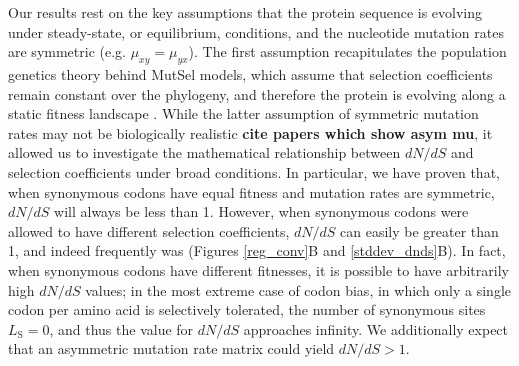 \documentclass[11pt]{article}
\begin{document}
Our results rest on the key assumptions that the protein sequence is evolving under steady-state, or equilibrium, conditions, and the nucleotide mutation rates are symmetric (e.g. $\mu_{xy} = \mu_{yx}$). The first assumption recapitulates the population genetics theory behind MutSel models, which assume that selection coefficients remain constant over the phylogeny, and therefore the protein is evolving along a static fitness landscape \cite{HalpernBruno1998,Rodrigueetal2010,Tamurietal2012}. While the latter assumption of symmetric mutation rates may not be biologically realistic \textbf{cite papers which show asym mu}, it allowed us to investigate the mathematical relationship between $dN/dS$ and selection coefficients under broad conditions. In particular, we have proven that, when synonymous codons have equal fitness and mutation rates are symmetric, $dN/dS$ will always be less than 1. However, when synonymous codons were allowed to have different selection coefficients, $dN/dS$ can easily be greater than 1, and indeed frequently was (Figures \ref{reg_conv}B and \ref{stddev_dnds}B). In fact, when synonymous codons have different fitnesses, it is possible to have arbitrarily high $dN/dS$ values; in the most extreme case of codon bias, in which only a single codon per amino acid is selectively tolerated, the number of synonymous sites $L_\text{S} = 0$, and thus the value for $dN/dS$ approaches infinity. We additionally expect that an asymmetric mutation rate matrix could yield $dN/dS > 1$.

\end{document}

